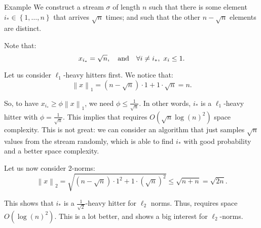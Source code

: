 \documentclass[a4paper]{article}
\begin{document}
\begin{parag}{Example}
    We construct a stream $\sigma$ of length $n$ such that there is some element $i_* \in \left\{1, \ldots, n\right\}$ that arrives $\sqrt{n}$ times; and such that the other $n - \sqrt{n}$ elements are distinct. 

    Note that: 
    \[x_{i_*} = \sqrt{n}, \quad \text{and} \quad  \forall i \neq i_*,\ x_i \leq 1.\]
    
    Let us consider $\ell_1$-heavy hitters first. We notice that:
    \[\left\|x\right\|_1 = \left(n - \sqrt{n}\right)\cdot 1 + 1\cdot \sqrt{n} = n.\]

    So, to have $x_{i_*} \geq \phi \left\|x\right\|_1$, we need $\phi \leq \frac{1}{\sqrt{n}}$. In other words, $i_*$ is a $\ell_1$-heavy hitter with $\phi=\frac{1}{\sqrt{n}}$. This implies that  requires $O\left(\sqrt{n} \log\left(n\right)^2\right)$ space complexity. This is not great: we can consider an algorithm that just samples $\sqrt{n}$ values from the stream randomly, which is able to find $i_*$ with good probability and a better space complexity.

    Let us now consider 2-norms: 
    \[\left\|x\right\|_2 = \sqrt{\left(n - \sqrt{n}\right)\cdot 1^2 + 1\cdot \left(\sqrt{n}\right)^2} \leq \sqrt{n + n} = \sqrt{2n}.\]

    This shows that $i_*$ is a $\frac{1}{\sqrt{2}}$-heavy hitter for $\ell_2$ norms. Thus,  requires space $O\left(\log\left(n\right)^2\right)$. This is a lot better, and shows a big interest for $\ell_2$-norms.
\end{parag}
\end{document}
